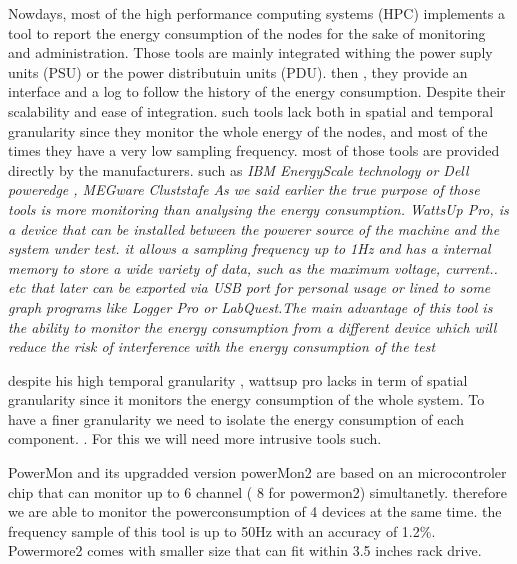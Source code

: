 Nowdays, most of the high performance computing systems (HPC) implements a tool to report the energy consumption of the nodes for the sake of monitoring and administration. Those tools are mainly integrated withing the power suply units (PSU) or the power distributuin units (PDU). then , they provide an interface and a log to follow the history of the energy consumption. Despite their scalability and ease of integration. such tools lack both in spatial and temporal granularity since they monitor the whole energy of the nodes, and most of the times they have a very low sampling frequency. most of those tools are provided directly by the manufacturers. such as \em{IBM EnergyScale technology} \cite{mccreary2007energyscale} \cite{caldeira2014ibm} \cite{caldeiraibm} or \em{Dell poweredge} \cite{lovicott2009thermal}, MEGware Cluststafe \cite{breitbart2015case}
As we said earlier the true purpose of those tools is more monitoring than analysing the energy consumption.
WattsUp Pro, is a device that can be installed  between the  powerer source of the machine and the system under test. it allows a sampling frequency up to 1Hz and has a internal memory to store a wide variety of data, such as the maximum voltage, current.. etc that later can be exported via USB port for personal usage or lined to some graph programs like Logger Pro or LabQuest.The main advantage of this tool is the ability to monitor the energy consumption from a different device which will reduce the risk of interference with the energy consumption of the test %
\cite{hirst2013watts}

despite his high temporal granularity  , wattsup pro lacks in term of spatial granularity since it monitors the energy consumption of the whole system.
To have a finer granularity we need to isolate the energy consumption of each component.
.
For this we will need more intrusive tools such.



PowerMon and its upgradded version powerMon2 \cite{bedard2010powermon} are based on an microcontroler chip that can monitor up to 6 channel ( 8 for powermon2) simultanetly. therefore we are able to monitor the powerconsumption of 4 devices at the same time. the frequency sample of this tool is up to 50Hz with an accuracy of 1.2\%. Powermore2 comes with smaller size that can fit within 3.5 inches rack drive.

